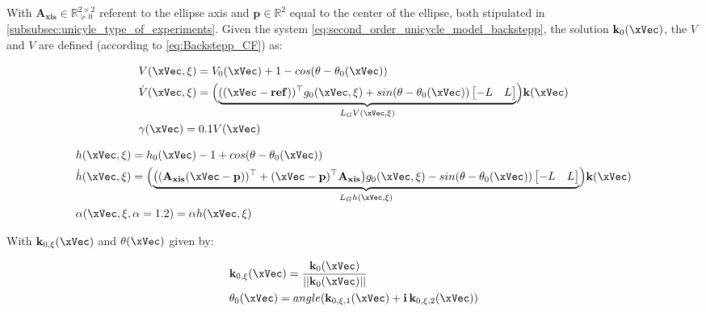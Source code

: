 With \(\mathbf{A_{xis}} \in \mathbb{R}^{2 \times 2}_{\succeq 0}\) referent to the ellipse axis and \(\mathbf{p} \in \mathbb{R}^2\) equal to the center of the ellipse, both stipulated in \ref{subsubsec:unicyle_type_of_experiments}. Given the system \ref{eq:second_order_unicycle_model_backstepp}, the solution \(\mathbf{k}_0(\xVec)\), the  \(V\) and  \(V\) are defined (according to \ref{eq:Backstepp_CF}) as:


\begin{subequations}
   \begin{align}
    &V(\xVec, \xi) = V_0(\xVec) + 1 - cos(\theta - \theta_0(\xVec)) \label{eq:V_unicycle} \\
    &\dot{V}(\xVec, \xi) = \Bigl(\underbrace{((\xVec-\mathbf{ref}))^{\top}g_0(\xVec, \xi) + sin(\theta -\theta_0(\xVec))\begin{bmatrix} -L & L \end{bmatrix}}_{L_GV(\xVec, \xi)} \Bigr) \mathbf{k}(\xVec)  \label{eq:dot_V_unicycle} \\
    &\gamma(\xVec)  = 0.1V(\xVec) \label{eq:CLF_gamma_unicycle}
\end{align}
\label{eq:CLF_unicycle}
\end{subequations}

\begin{subequations}
   \begin{align}
    &h(\xVec, \xi) = h_0(\xVec) - 1 + cos(\theta - \theta_0(\xVec)) \label{eq:h_unicycle} \\
    &\dot{h}(\xVec, \xi) = \Bigl(\underbrace{\bigl((\mathbf{A_{xis}}(\xVec-\mathbf{p}))^{\top} + (\xVec-\mathbf{p})^{\top}\mathbf{A_{xis}}\bigr)g_0(\xVec, \xi) - sin(\theta -\theta_0(\xVec))\begin{bmatrix} -L & L \end{bmatrix}}_{L_Gh(\xVec, \xi)} \Bigr) \mathbf{k}(\xVec)  \label{eq:dot_h_unicycle} \\
    &\alpha(\xVec, \xi, \alpha = 1.2)  = \alpha h(\xVec, \xi) \label{eq:CBF_alpha_unicycle}
\end{align}
\label{eq:CBF_unicycle}
\end{subequations}


With \(\mathbf{k}_{0,\xi}(\xVec)\) and \(\theta(\xVec)\) given by:

\begin{align}
    &\mathbf{k}_{0,\xi}(\xVec) = \frac{\mathbf{k}_0(\xVec) }{|| \mathbf{k}_0(\xVec) ||}      \\
    &\theta_0(\xVec) = angle(\mathbf{k}_{0,\xi,1}(\xVec) + \mathbf{i} \hspace{0.2em} \mathbf{k}_{0,\xi,2}(\xVec))
\end{align}


